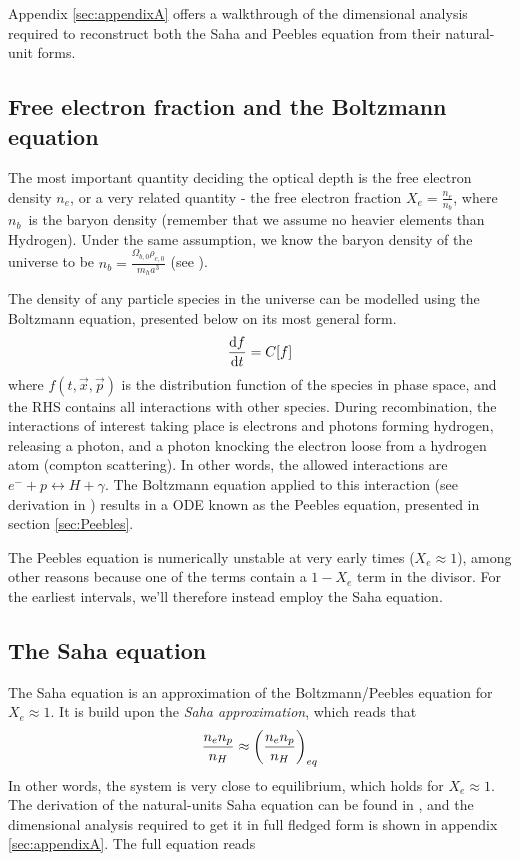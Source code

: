 \documentclass[10pt, a4paper]{article}
\begin{document}
Appendix \ref{sec:appendixA} offers a walkthrough of the dimensional analysis required to reconstruct both the Saha and Peebles equation from their natural-unit forms.


\subsection{Free electron fraction and the Boltzmann equation}
The most important quantity deciding the optical depth is the free electron density $n_e$, or a very related quantity - the free electron fraction $X_e = \frac{n_e}{n_b}$, where $n_b$ is the baryon density (remember that we assume no heavier elements than Hydrogen). Under the same assumption, we know the baryon density of the universe to be $n_b = \frac{\Omega_{b,0}\rho_{c,0}}{m_ha^3}$ (see \cite{Milestone1}).

The density of any particle species in the universe can be modelled using the Boltzmann equation, presented below on its most general form.
\begin{equation*}
    \dv{f}{t} = C[f]
\end{equation*}
where $f(t, \vec{x}, \vec{p})$ is the distribution function of the species in phase space, and the RHS contains all interactions with other species. During recombination, the interactions of interest taking place is electrons and photons forming hydrogen, releasing a photon, and a photon knocking the electron loose from a hydrogen atom (compton scattering). In other words, the allowed interactions are $e^- + p \leftrightarrow H + \gamma$. The Boltzmann equation applied to this interaction (see derivation in \cite{ModernCosmology2003}) results in a ODE known as the Peebles equation, presented in section \ref{sec:Peebles}. 

The Peebles equation is numerically unstable at very early times ($X_e \approx 1$), among other reasons because one of the terms contain a $1-X_e$ term in the divisor. For the earliest intervals, we'll therefore instead employ the Saha equation.


\subsection{The Saha equation}
The Saha equation is an approximation of the Boltzmann/Peebles equation for $X_e \approx 1$. It is build upon the \textit{Saha approximation}, which reads that
\begin{equation*}
    \frac{n_e n_p}{n_H} \approx \qty(\frac{n_e n_p}{n_H})_{eq}
\end{equation*}
In other words, the system is very close to equilibrium, which holds for $X_e\approx 1$. The derivation of the natural-units Saha equation can be found in \cite{ModernCosmology2003}, and the dimensional analysis required to get it in full fledged form is shown in appendix \ref{sec:appendixA}. The full equation reads
\end{document}
